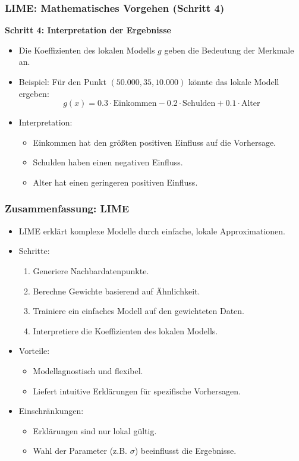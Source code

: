 \documentclass[aspectratio=1610, xcolor=dvipsnames, 9pt]{beamer}
\begin{document}
\begin{frame}
  \frametitle{LIME: Mathematisches Vorgehen (Schritt 4)}
  \textbf{Schritt 4: Interpretation der Ergebnisse}
  \begin{itemize}
    \item Die Koeffizienten des lokalen Modells $g$ geben die Bedeutung der Merkmale an.
    \item Beispiel: Für den Punkt $(50.000, 35, 10.000)$ könnte das lokale Modell ergeben:
    \[
    g(x) = 0.3 \cdot \text{Einkommen} - 0.2 \cdot \text{Schulden} + 0.1 \cdot \text{Alter}
    \]
    \item Interpretation:
    \begin{itemize}
      \item Einkommen hat den größten positiven Einfluss auf die Vorhersage.
      \item Schulden haben einen negativen Einfluss.
      \item Alter hat einen geringeren positiven Einfluss.
    \end{itemize}
  \end{itemize}
\end{frame}

\begin{frame}
  \frametitle{Zusammenfassung: LIME}
  \begin{itemize}
    \item LIME erklärt komplexe Modelle durch einfache, lokale Approximationen.
    \item Schritte:
    \begin{enumerate}
      \item Generiere Nachbardatenpunkte.
      \item Berechne Gewichte basierend auf Ähnlichkeit.
      \item Trainiere ein einfaches Modell auf den gewichteten Daten.
      \item Interpretiere die Koeffizienten des lokalen Modells.
    \end{enumerate}
    \item Vorteile:
    \begin{itemize}
      \item Modellagnostisch und flexibel.
      \item Liefert intuitive Erklärungen für spezifische Vorhersagen.
    \end{itemize}
    \item Einschränkungen:
    \begin{itemize}
      \item Erklärungen sind nur lokal gültig.
      \item Wahl der Parameter (z.B. $\sigma$) beeinflusst die Ergebnisse.
    \end{itemize}
  \end{itemize}
\end{frame}
\end{document}
